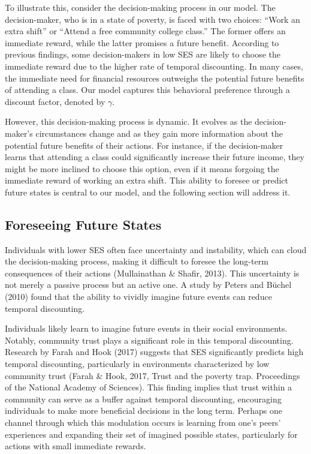 \documentclass[
]{report}
\begin{document}
To illustrate this, consider the decision-making process in our model.
The decision-maker, who is in a state of poverty, is faced with two
choices: ``Work an extra shift'' or ``Attend a free community college
class.'' The former offers an immediate reward, while the latter
promises a future benefit. According to previous findings, some
decision-makers in low SES are likely to choose the immediate reward due
to the higher rate of temporal discounting. In many cases, the immediate
need for financial resources outweighs the potential future benefits of
attending a class. Our model captures this behavioral preference through
a discount factor, denoted by \(\gamma\).

However, this decision-making process is dynamic. It evolves as the
decision-maker's circumstances change and as they gain more information
about the potential future benefits of their actions. For instance, if
the decision-maker learns that attending a class could significantly
increase their future income, they might be more inclined to choose this
option, even if it means forgoing the immediate reward of working an
extra shift. This ability to foresee or predict future states is central
to our model, and the following section will address it.

\hypertarget{foreseeing-future-states}{%
\subsection{Foreseeing Future States}\label{foreseeing-future-states}}

Individuals with lower SES often face uncertainty and instability, which
can cloud the decision-making process, making it difficult to foresee
the long-term consequences of their actions (Mullainathan \& Shafir,
2013). This uncertainty is not merely a passive process but an active
one. A study by Peters and Büchel (2010) found that the ability to
vividly imagine future events can reduce temporal discounting.

Individuals likely learn to imagine future events in their social
environments. Notably, community trust plays a significant role in this
temporal discounting. Research by Farah and Hook (2017) suggests that
SES significantly predicts high temporal discounting, particularly in
environments characterized by low community trust (Farah \& Hook, 2017,
Trust and the poverty trap. Proceedings of the National Academy of
Sciences). This finding implies that trust within a community can serve
as a buffer against temporal discounting, encouraging individuals to
make more beneficial decisions in the long term. Perhaps one channel
through which this modulation occurs is learning from one's peers'
experiences and expanding their set of imagined possible states,
particularly for actions with small immediate rewards.
\end{document}
